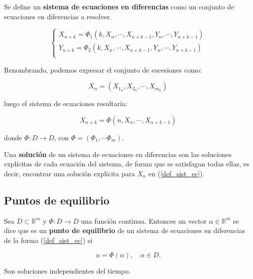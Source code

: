 \begin{definition}
Se define un \textbf{sistema de ecuaciones en diferencias} como un conjunto de ecuaciones en diferencias a resolver.

\begin{equation}
\begin{cases}
X_{n+k} = \Phi_1(k, X_n, \cdots , X_{n+k-1}, Y_n, \cdots, Y_{n+k-1}) \\
Y_{n+k} = \Phi_2(k, X_n, \cdots , X_{n+k-1}, Y_n, \cdots, Y_{n+k-1}) \\
\end{cases}
\end{equation}

Renombrando, podemos expresar el conjunto de sucesiones como:

\begin{equation}
X_n = (X_{1_n}, X_{2_n}, \cdots , X_{m_n})
\end{equation}

luego el sistema de ecuaciones resultaría:

\begin{equation}
\label{def_sist_ec}
X_{n+k} = \Phi (n, X_n, \cdots , X_{n+k-1})
\end{equation}


donde $\Phi : D \rightarrow D$, con $\Phi = (\Phi_1, \cdots \Phi_m)$.

\end{definition}

\begin{definition}
Una \textbf{solución} de un sistema de ecuaciones en diferencias son las soluciones explícitas de cada ecuación del sistema, de forma que se satisfagan todas ellas, es decir, encontrar una solución explícita para $X_n$ en (\ref{def_sist_ec}).
\end{definition}

\subsection{Puntos de equilibrio}

\begin{definition}
Sea $D\subset \mathbb{R}^m$ y $\Phi :D\rightarrow D$ una función continua. Entonces un vector $\alpha \in \mathbb{R}^m$ se dice que es un \textbf{punto de equilibrio} de un sistema de ecuaciones en diferencias de la forma (\ref{def_sist_ec}) si

$$\alpha = \Phi (\alpha),\quad \alpha \in D.$$

Son soluciones independientes del tiempo.
\end{definition}

